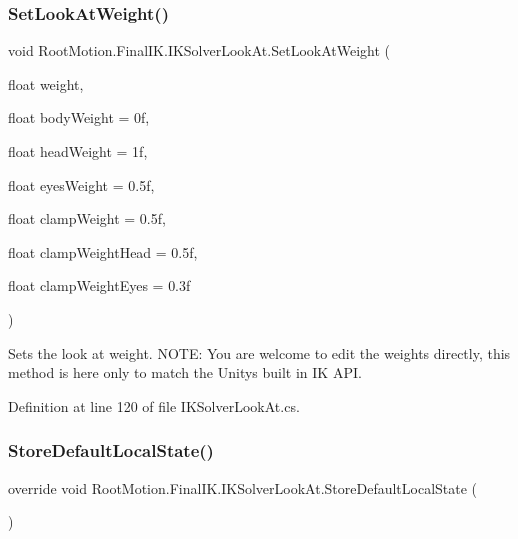 \subsubsection{\texorpdfstring{Set\+Look\+At\+Weight()}{SetLookAtWeight()}\hspace{0.1cm}{\footnotesize\ttfamily [6/6]}}
{\footnotesize\ttfamily void Root\+Motion.\+Final\+I\+K.\+I\+K\+Solver\+Look\+At.\+Set\+Look\+At\+Weight (\begin{DoxyParamCaption}\item[{float}]{weight,  }\item[{float}]{body\+Weight = {\ttfamily 0f},  }\item[{float}]{head\+Weight = {\ttfamily 1f},  }\item[{float}]{eyes\+Weight = {\ttfamily 0.5f},  }\item[{float}]{clamp\+Weight = {\ttfamily 0.5f},  }\item[{float}]{clamp\+Weight\+Head = {\ttfamily 0.5f},  }\item[{float}]{clamp\+Weight\+Eyes = {\ttfamily 0.3f} }\end{DoxyParamCaption})}



Sets the look at weight. N\+O\+TE\+: You are welcome to edit the weights directly, this method is here only to match the Unity\textquotesingle{}s built in IK A\+PI. 



Definition at line 120 of file I\+K\+Solver\+Look\+At.\+cs.

\mbox{\label{class_root_motion_1_1_final_i_k_1_1_i_k_solver_look_at_a4afca882415d4749c312c52f349e1d0d}} 
\subsubsection{\texorpdfstring{Store\+Default\+Local\+State()}{StoreDefaultLocalState()}}
{\footnotesize\ttfamily override void Root\+Motion.\+Final\+I\+K.\+I\+K\+Solver\+Look\+At.\+Store\+Default\+Local\+State (\begin{DoxyParamCaption}{ }\end{DoxyParamCaption})\hspace{0.3cm}{\ttfamily [virtual]}}



